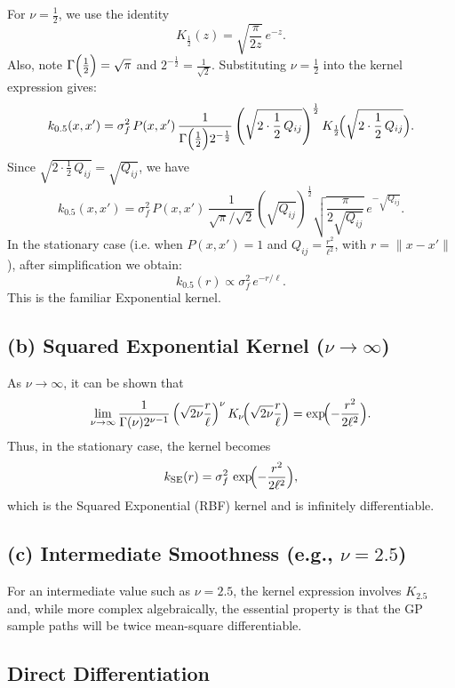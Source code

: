 \documentclass[11pt]{article}
\begin{document}
For $\nu=\frac{1}{2}$, we use the identity
\[
K_{\frac{1}{2}}(z)=\sqrt{\frac{\pi}{2z}}\,e^{-z}.
\]
Also, note $\Gamma\Bigl({\frac{1}{2}}\Bigr)=\sqrt{\pi}$ and $2^{-\frac{1}{2}}=\frac{1}{\sqrt{2}}$. Substituting $\nu=\frac{1}{2}$ into the kernel expression gives:
\[
k_{0.5}(x,x')=\sigma_f^2\,P(x,x')\, \frac{1}{\Gamma\Bigl({\frac{1}{2}}\Bigr)2^{-\frac{1}{2}}}
\left(\sqrt{2\cdot\frac{1}{2}\,Q_{ij}}\right)^{\frac{1}{2}}K_{\frac{1}{2}}\!\Bigl({\sqrt{2\cdot\frac{1}{2}\,Q_{ij}}}\Bigr).
\]
Since $\sqrt{2\cdot\frac{1}{2}\,Q_{ij}}=\sqrt{Q_{ij}}$, we have
\[
k_{0.5}(x,x')=\sigma_f^2\,P(x,x')\, \frac{1}{\sqrt{\pi}/\sqrt{2}}
\left(\sqrt{Q_{ij}}\right)^{\frac{1}{2}}
\sqrt{\frac{\pi}{2\sqrt{Q_{ij}}}}\,e^{-\sqrt{Q_{ij}}}.
\]
In the stationary case (i.e. when $P(x,x')=1$ and $Q_{ij}=\frac{r^2}{\ell^2}$, with $r=\|x-x'\|$), after simplification we obtain:
\[
k_{0.5}(r)\propto \sigma_f^2\,e^{-r/\ell}.
\]
This is the familiar Exponential kernel.

\medskip

\subsection*{(b) Squared Exponential Kernel ($\nu\to\infty$)}

As $\nu\to\infty$, it can be shown that
\[
\lim_{\nu\to\infty}\frac{1}{\Gamma(\nu)2^{\nu-1}}
\left(\sqrt{2\nu}\frac{r}{\ell}\right)^{\nu}K_{\nu}\!\Bigl({\sqrt{2\nu}\frac{r}{\ell}}\Bigr)
=\exp\!\Bigl({-\frac{r^2}{2\ell^2}}\Bigr).
\]
Thus, in the stationary case, the kernel becomes
\[
k_{\text{SE}}(r)=\sigma_f^2\,\exp\!\Bigl({-\frac{r^2}{2\ell^2}}\Bigr),
\]
which is the Squared Exponential (RBF) kernel and is infinitely differentiable.

\medskip

\subsection*{(c) Intermediate Smoothness (e.g., $\nu=2.5$)}

For an intermediate value such as $\nu=2.5$, the kernel expression involves $K_{2.5}$ and, while more complex algebraically, the essential property is that the GP sample paths will be twice mean-square differentiable.


\subsection*{Direct Differentiation}
\end{document}
